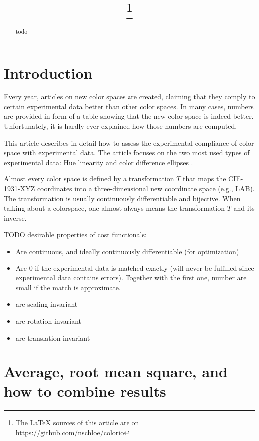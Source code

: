 \documentclass{scrartcl}
\title{\mytitle\footnote{The LaTeX sources of this article are on
\url{https://github.com/nschloe/colorio}}}
\author{\myauthor}
\theoremstyle{named}
\begin{document}
\maketitle
\begin{abstract}
  todo
\end{abstract}

\section{Introduction}

Every year, articles on new color spaces are created, claiming that they comply to
certain experimental data better than other color spaces. In many cases, numbers are
provided in form of a table showing that the new color space is indeed better.
Unfortunately, it is hardly ever explained how those numbers are computed.

This article describes in detail how to assess the experimental compliance of color
space with experimental data. The article focuses on the two most used types of
experimental data: Hue linearity \cite{ebner,xiao,hung} and color difference ellipses
\cite{macadam1942,luorigg}.

Almost every color space is defined by a transformation $T$ that maps the CIE-1931-XYZ
coordinates into a three-dimensional new coordinate space (e.g., LAB). The
transformation is usually continuously differentiable and bijective. When talking about
a colorspace, one almost always means the transformation $T$ and its inverse.


TODO desirable properties of cost functionals:
\begin{itemize}
  \item Are continuous, and ideally continuously differentiable (for optimization)
  \item Are 0 if the experimental data is matched exactly (will never be fulfilled since
    experimental data contains errors). Together with the first one, number are small if
    the match is approximate.
  \item are scaling invariant
  \item are rotation invariant
  \item are translation invariant
\end{itemize}


\section{Average, root mean square, and how to combine results}
\end{document}

